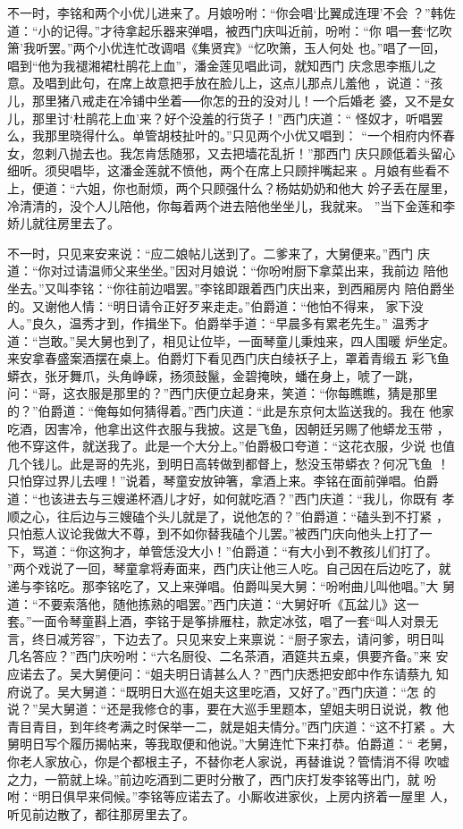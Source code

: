 不一时，李铭和两个小优儿进来了。月娘吩咐：“你会唱‘比翼成连理’不会
？”韩佐道：“小的记得。”才待拿起乐器来弹唱，被西门庆叫近前，吩咐：“你
唱一套‘忆吹箫’我听罢。”两个小优连忙改调唱《集贤宾》“忆吹箫，玉人何处
也。”唱了一回，唱到“他为我褪湘裙杜鹃花上血”，潘金莲见唱此词，就知西门
庆念思李瓶儿之意。及唱到此句，在席上故意把手放在脸儿上，这点儿那点儿羞他
，说道：“孩儿，那里猪八戒走在冷铺中坐着──你怎的丑的没对儿！一个后婚老
婆，又不是女儿，那里讨‘杜鹃花上血’来？好个没羞的行货子！”西门庆道：“
怪奴才，听唱罢么，我那里晓得什么。单管胡枝扯叶的。”只见两个小优又唱到：
“一个相府内怀春女，忽剌八抛去也。我怎肯恁随邪，又去把墙花乱折！”那西门
庆只顾低着头留心细听。须臾唱毕，这潘金莲就不愤他，两个在席上只顾拌嘴起来
。月娘有些看不上，便道：“六姐，你也耐烦，两个只顾强什么？杨姑奶奶和他大
妗子丢在屋里，冷清清的，没个人儿陪他，你每着两个进去陪他坐坐儿，我就来。
”当下金莲和李娇儿就往房里去了。

不一时，只见来安来说：“应二娘帖儿送到了。二爹来了，大舅便来。”西门
庆道：“你对过请温师父来坐坐。”因对月娘说：“你吩咐厨下拿菜出来，我前边
陪他坐去。”又叫李铭：“你往前边唱罢。”李铭即跟着西门庆出来，到西厢房内
陪伯爵坐的。又谢他人情：“明日请令正好歹来走走。”伯爵道：“他怕不得来，
家下没人。”良久，温秀才到，作揖坐下。伯爵举手道：“早晨多有累老先生。”
温秀才道：“岂敢。”吴大舅也到了，相见让位毕，一面琴童儿秉烛来，四人围暖
炉坐定。来安拿春盛案酒摆在桌上。伯爵灯下看见西门庆白绫袄子上，罩着青缎五
彩飞鱼蟒衣，张牙舞爪，头角峥嵘，扬须鼓鬣，金碧掩映，蟠在身上，唬了一跳，
问：“哥，这衣服是那里的？”西门庆便立起身来，笑道：“你每瞧瞧，猜是那里
的？”伯爵道：“俺每如何猜得着。”西门庆道：“此是东京何太监送我的。我在
他家吃酒，因害冷，他拿出这件衣服与我披。这是飞鱼，因朝廷另赐了他蟒龙玉带
，他不穿这件，就送我了。此是一个大分上。”伯爵极口夸道：“这花衣服，少说
也值几个钱儿。此是哥的先兆，到明日高转做到都督上，愁没玉带蟒衣？何况飞鱼
！只怕穿过界儿去哩！”说着，琴童安放钟箸，拿酒上来。李铭在面前弹唱。伯爵
道：“也该进去与三嫂递杯酒儿才好，如何就吃酒？”西门庆道：“我儿，你既有
孝顺之心，往后边与三嫂磕个头儿就是了，说他怎的？”伯爵道：“磕头到不打紧
，只怕惹人议论我做大不尊，到不如你替我磕个儿罢。”被西门庆向他头上打了一
下，骂道：“你这狗才，单管恁没大小！”伯爵道：“有大小到不教孩儿们打了。
”两个戏说了一回，琴童拿将寿面来，西门庆让他三人吃。自己因在后边吃了，就
递与李铭吃。那李铭吃了，又上来弹唱。伯爵叫吴大舅：“吩咐曲儿叫他唱。”大
舅道：“不要索落他，随他拣熟的唱罢。”西门庆道：“大舅好听《瓦盆儿》这一
套。”一面令琴童斟上酒，李铭于是筝排雁柱，款定冰弦，唱了一套“叫人对景无
言，终日减芳容”，下边去了。只见来安上来禀说：“厨子家去，请问爹，明日叫
几名答应？”西门庆吩咐：“六名厨役、二名茶酒，酒筵共五桌，俱要齐备。”来
安应诺去了。吴大舅便问：“姐夫明日请甚么人？”西门庆悉把安郎中作东请蔡九
知府说了。吴大舅道：“既明日大巡在姐夫这里吃酒，又好了。”西门庆道：“怎
的说？”吴大舅道：“还是我修仓的事，要在大巡手里题本，望姐夫明日说说，教
他青目青目，到年终考满之时保举一二，就是姐夫情分。”西门庆道：“这不打紧
。大舅明日写个履历揭帖来，等我取便和他说。”大舅连忙下来打恭。伯爵道：“
老舅，你老人家放心，你是个都根主子，不替你老人家说，再替谁说？管情消不得
吹嘘之力，一箭就上垛。”前边吃酒到二更时分散了，西门庆打发李铭等出门，就
吩咐：“明日俱早来伺候。”李铭等应诺去了。小厮收进家伙，上房内挤着一屋里
人，听见前边散了，都往那房里去了。

